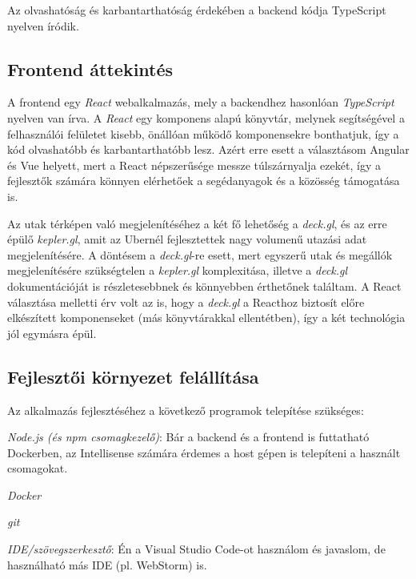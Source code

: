 Az olvashatóság és karbantarthatóság érdekében a backend kódja TypeScript nyelven íródik.

\subsection{Frontend áttekintés}

A frontend egy \textit{React} webalkalmazás, mely a backendhez hasonlóan \textit{TypeScript} nyelven van írva. A \textit{React} egy komponens alapú könyvtár, melynek segítségével a felhasználói felületet kisebb, önállóan működő komponensekre bonthatjuk, így a kód olvashatóbb és karbantarthatóbb lesz. Azért erre esett a választásom Angular és Vue helyett, mert a React népszerűsége messze túlszárnyalja ezekét\cite{reactcomparison}, így a fejlesztők számára könnyen elérhetőek a segédanyagok és a közösség támogatása is.

Az utak térképen való megjelenítéséhez a két fő lehetőség a \textit{deck.gl}, és az erre épülő\cite{kepler} \textit{kepler.gl}, amit az Ubernél fejlesztettek nagy volumenű utazási adat megjelenítésére. A döntésem a \textit{deck.gl}-re esett, mert egyszerű utak és megállók megjelenítésére szükségtelen a \textit{kepler.gl} komplexitása, illetve a \textit{deck.gl} dokumentációját is részletesebbnek és könnyebben érthetőnek találtam. A React választása melletti érv volt az is, hogy a \textit{deck.gl} a Reacthoz biztosít előre elkészített komponenseket (más könyvtárakkal ellentétben), így a két technológia jól egymásra épül.

\subsection{Fejlesztői környezet felállítása}

Az alkalmazás fejlesztéséhez a következő programok telepítése szükséges:

\begin{compactitem}
    \item \textit{Node.js (és npm csomagkezelő)}: Bár a backend és a frontend is futtatható Dockerben, az Intellisense számára érdemes a host gépen is telepíteni a használt csomagokat.
    \item \textit{Docker}
    \item \textit{git}
    \item \textit{IDE/szövegszerkesztő}: Én a Visual Studio Code-ot használom és javaslom, de használható más IDE (pl. WebStorm) is.
\end{compactitem}

